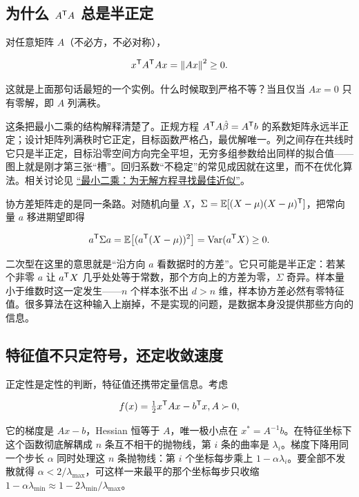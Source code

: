 \subsection{\texorpdfstring{为什么 \(A^{\mathsf{T}}A\) 总是半正定}{为什么 A 的转置乘 A 总是半正定}}

对任意矩阵 \(A\)（不必方，不必对称），

\[
x^{\mathsf{T}}A^{\mathsf{T}}Ax=\left\lVert Ax\right\rVert^2\ge0 .
\]

这就是上面那句话最短的一个实例。什么时候取到严格不等？当且仅当 \(Ax=0\) 只有零解，即 \(A\) 列满秩。

这条把最小二乘的结构解释清楚了。正规方程 \(A^{\mathsf{T}}A\hat\beta=A^{\mathsf{T}}b\) 的系数矩阵永远半正定；设计矩阵列满秩时它正定，目标函数严格凸，最优解唯一。列之间存在共线时它只是半正定，目标沿零空间方向完全平坦，无穷多组参数给出同样的拟合值——图上就是刚才第三张``槽''。回归系数``不稳定''的常见成因就在这里，而不在优化算法。相关讨论见 \hyperref[sec:03-Linear-Algebra/03-Orthogonality/03]{``最小二乘：为无解方程寻找最佳近似''}。

协方差矩阵走的是同一条路。对随机向量 \(X\)，\(\Sigma=\mathbb{E}[(X-\mu)(X-\mu)^{\mathsf{T}}]\)，把常向量 \(a\) 移进期望即得

\[
a^{\mathsf{T}}\Sigma a=\mathbb{E}\bigl[(a^{\mathsf{T}}(X-\mu))^2\bigr]=\operatorname{Var}(a^{\mathsf{T}}X)\ge0 .
\]

二次型在这里的意思就是``沿方向 \(a\) 看数据时的方差''。它只可能是半正定：若某个非零 \(a\) 让 \(a^{\mathsf{T}}X\) 几乎处处等于常数，那个方向上的方差为零，\(\Sigma\) 奇异。样本量小于维数时这一定发生——\(n\) 个样本张不出 \(d>n\) 维，样本协方差必然有零特征值。很多算法在这种输入上崩掉，不是实现的问题，是数据本身没提供那些方向的信息。

\subsection{特征值不只定符号，还定收敛速度}

正定性是定性的判断，特征值还携带定量信息。考虑

\[
f(x)=\tfrac12x^{\mathsf{T}}Ax-b^{\mathsf{T}}x,\space A\succ0,
\]

它的梯度是 \(Ax-b\)，Hessian 恒等于 \(A\)，唯一极小点在 \(x^*=A^{-1}b\)。在特征坐标下这个函数彻底解耦成 \(n\) 条互不相干的抛物线，第 \(i\) 条的曲率是 \(\lambda_i\)。梯度下降用同一个步长 \(\alpha\) 同时处理这 \(n\) 条抛物线：第 \(i\) 个坐标每步乘上 \(1-\alpha\lambda_i\)。要全部不发散就得 \(\alpha<2/\lambda_{\max}\)，可这样一来最平的那个坐标每步只收缩 \(1-\alpha\lambda_{\min}\approx1-2\lambda_{\min}/\lambda_{\max}\)。

